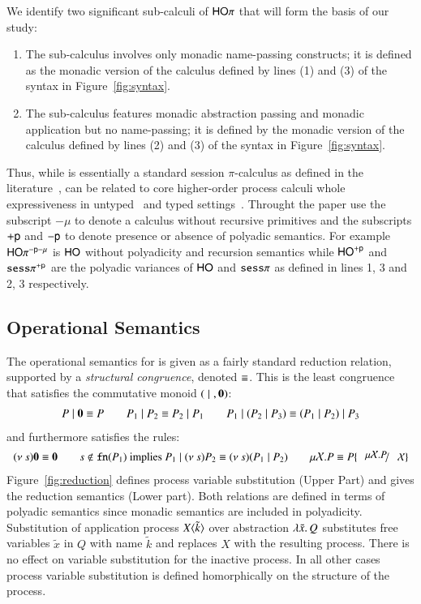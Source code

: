 We identify two significant sub-calculi of $\mathsf{HO}\pi$ that will form 
the basis of our study:
%
\begin{enumerate}[-]
	\item	The sub-calculus \sessp involves only monadic name-passing constructs; it is 
		defined as the monadic version of the calculus defined by lines (1) and (3)
		of the syntax in Figure~\ref{fig:syntax}.

	\item	The sub-calculus \HO features monadic abstraction passing and monadic application
		but no name-passing; 
		it is defined by the monadic version of the calculus defined by lines (2) and (3) of
		the syntax in Figure~\ref{fig:syntax}.
\end{enumerate}
%
Thus, while \sessp is essentially a standard session $\pi$-calculus as defined in the
literature~\cite{honda.vasconcelos.kubo:language-primitives,GH05},
\HO can be related to core higher-order process calculi whole expressiveness
in untyped~\cite{} and typed settings~\cite{}.%
Throught the paper use the subscript $-\mu$ to denote a calculus without recursive
primitives and the subscripts $+\mathsf{p}$ and $-\mathsf{p}$ to denote presence or
absence of polyadic semantics. For example $\mathsf{HO}\pi^{-\mathsf{p}-\mu}$ is $\mathsf{HO}$ without
polyadicity and recursion semantics while $\mathsf{HO}^{+\mathsf{p}}$ and $\mathtt{sess}\pi^{+\mathsf{p}}$
are the polyadic variances of $\mathsf{HO}$ and $\mathtt{sess}\pi$ as defined in lines 1, 3 and 2, 3 respectively.

\subsection{Operational Semantics}

The operational semantics for \HOp is given as a fairly standard reduction relation, supported by
a \emph{structural congruence}, denoted $\equiv$. This is 
the least congruence that satisfies the commutative monoid $(\;|\;, \mathbf{0})$:
%
\[
	\begin{array}{c}
		P \;|\; \mathbf{0} \equiv P
		\qquad
		P_1 \;|\; P_2 \equiv P_2 \;|\; P_1
		\qquad
		P_1 \;|\; (P_2 \;|\; P_3) \equiv (P_1 \;|\; P_2) \;|\; P_3
	\end{array}
\]
%
\noi and furthermore satisfies the rules:
%
\[
\begin{array}{c}
	\news{s} \inact \scong \inact
	\qquad
	s \notin \fn{P_1} \textrm{  implies  } P_1 \Par \news{s} P_2 \scong \news{s}(P_1 \Par P_2)
	\qquad
	\recp{X}{P} \scong P\subst{\recp{X}{P}}{\rvar{X}}
\end{array}
\]
%
\noi Figure~\ref{fig:reduction} defines
process variable substitution (Upper Part) and gives the 
reduction semantics (Lower part).
Both relations are defined in terms of polyadic semantics since
monadic semantics are included in polyadicity.
Substitution of application process $X\langle \tilde{k} \rangle$
over abstraction $\lambda \tilde{x}.\,Q$ substitutes free variables
$\tilde{x}$ in $Q$ with name $\tilde{k}$ and replaces
$X$ with the resulting process.
There is no effect on variable substitution for the inactive process.
In all other cases process variable substitution is defined
homorphically on the structure of the process.

